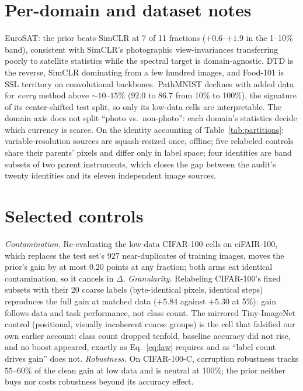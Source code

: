 \section{Per-domain and dataset notes}\label{app:domains}

 EuroSAT: the prior beats SimCLR at 7 of 11 fractions
($+0.6$--$+1.9$ in the 1--10\% band), consistent with SimCLR's photographic
view-invariances transferring poorly to satellite statistics while the
spectral target is domain-agnostic. DTD is the reverse, SimCLR dominating
from a few hundred images, and Food-101 is SSL territory on convolutional
backbones. PathMNIST declines with added data for \emph{every} method above
${\sim}10$--$15\%$ ($92.0$ to $86.7$ from 10\% to 100\%), the signature of
its center-shifted test split, so only its low-data cells are interpretable.
The domain axis does not split ``photo vs.\ non-photo'': each domain's
statistics decide which currency is scarce. On the identity accounting of
Table~\ref{tab:partitions}: variable-resolution sources are squash-resized
once, offline; five relabeled controls share their parents' pixels and
differ only in label space; four identities are band subsets of two parent
instruments, which closes the gap between the audit's twenty identities and
its eleven independent image sources.

\section{Selected controls}\label{app:controls}

 \emph{Contamination.} Re-evaluating the low-data CIFAR-100
cells on ciFAIR-100, which replaces the test set's 927 near-duplicates of
training images, moves the prior's gain by at most $0.20$ points at any
fraction; both arms eat identical contamination, so it cancels in $\Delta$.
\emph{Granularity.} Relabeling CIFAR-100's fixed subsets with their 20
coarse labels (byte-identical pixels, identical steps) reproduces the full
gain at matched data ($+5.84$ against $+5.30$ at 5\%): gain follows data and
task performance, not class count. The mirrored Tiny-ImageNet control
(positional, visually incoherent coarse groups) is the cell that falsified
our own earlier account: class count dropped tenfold, baseline accuracy did
not rise, and no \readout{} boost appeared, exactly as Eq.~\ref{eq:law}
requires and as ``label count drives gain'' does not. \emph{Robustness.} On
CIFAR-100-C, corruption robustness tracks $55$--$60\%$ of the clean gain at
low data and is neutral at 100\%; the prior neither buys nor costs
robustness beyond its accuracy effect.

